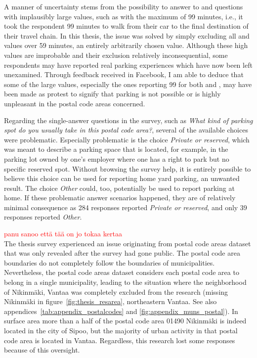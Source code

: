A manner of uncertainty stems from the possibility to answer to  and  questions with implausibly large values, such as with the maximum of 99 minutes, i.e., it took the respondent 99 minutes to walk from their car to the final destination of their travel chain. In this thesis, the issue was solved by simply excluding all  and  values over 59 minutes, an entirely arbitrarily chosen value. Although these high values are improbable and their exclusion relatively inconsequential, some respondents may have reported real parking experiences which have now been left unexamined. Through feedback received in Facebook, I am able to deduce that some of the large values, especially the ones reporting 99 for both  and , may have been made as protest to signify that parking is not possible or is highly unpleasant in the postal code areas concerned.

Regarding the single-answer questions in the survey, such as \textit{What kind of parking spot do you usually take in this postal code area?}, several of the available choices were problematic. Especially problematic is the choice \textit{Private or reserved}, which was meant to describe a parking space that is located, for example, in the parking lot owned by one's employer where one has a right to park but no specific reserved spot. Without browsing the survey help, it is entirely possible to believe this choice can be used for reporting home yard parking, an unwanted result. The choice \textit{Other} could, too, potentially be used to report parking at home. If these problematic  answer scenarios happened, they are of relatively minimal consequence as 284 responses reported \textit{Private or reserved}, and only 39 responses reported \textit{Other}.

\textcolor{red}{panu sanoo että tää on jo tokaa kertaa} \\
The thesis survey experienced an issue originating from postal code areas dataset that was only revealed after the survey had gone public. The postal code area boundaries do not completely follow the boundaries of municipalities. Nevertheless, the postal code areas dataset considers each postal code area to belong in a single municipality, leading to the situation where the neighborhood of Nikinmäki, Vantaa was completely excluded from the research (missing Nikinmäki in figure~\ref{fig:thesis_resarea}, northeastern Vantaa. See also appendices~\ref{tab:appendix_postalcodes} and \ref{fig:appendix_muns_postal}). In surface area more than a half of the postal code area 01490 Nikinmäki is indeed located in the city of Sipoo, but the majority of urban activity in that postal code area is located in Vantaa. Regardless, this research lost some responses because of this oversight.

